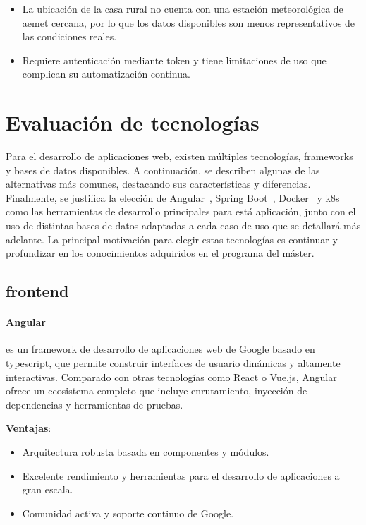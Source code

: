 \begin{itemize}
    \item La ubicación de la casa rural no cuenta con una estación meteorológica de \gls{aemet} cercana, por lo que los datos disponibles son menos representativos de las condiciones reales.
    \item Requiere autenticación mediante token y tiene limitaciones de uso que complican su automatización continua.
\end{itemize}


\section{Evaluación de tecnologías}
\label{sec:evaluacion-tecnologias}
Para el desarrollo de aplicaciones web, existen múltiples tecnologías, \glspl{framework} y bases de datos disponibles. A continuación, se describen algunas de las alternativas más comunes, destacando sus características y diferencias. Finalmente, se justifica la elección de Angular~\cite{angular}, Spring Boot~\cite{springboot}, Docker~\cite{docker} y \gls{k8s}~\cite{kubernetes} como las herramientas de desarrollo principales para está aplicación, junto con el uso de distintas bases de datos adaptadas a cada caso de uso que se detallará más adelante. La principal motivación para elegir estas tecnologías es continuar y profundizar en los conocimientos adquiridos en el programa del máster.


\subsection{\gls{frontend}}

\paragraph{Angular~\cite{angular}} es un \gls{framework} de desarrollo de aplicaciones web de Google basado en \gls{typescript}, que permite construir interfaces de usuario dinámicas y altamente interactivas. Comparado con otras tecnologías como React o Vue.js, Angular ofrece un ecosistema completo que incluye enrutamiento, inyección de dependencias y herramientas de pruebas.

\textbf{Ventajas}:
\begin{itemize}
    \item Arquitectura robusta basada en componentes y módulos.
    \item Excelente rendimiento y herramientas para el desarrollo de aplicaciones a gran escala.
    \item Comunidad activa y soporte continuo de Google.
\end{itemize}

